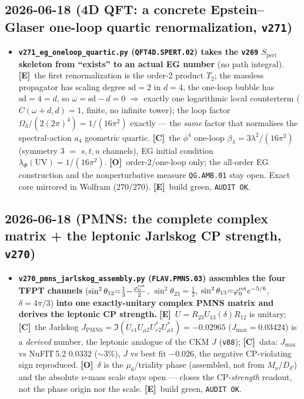 \documentclass[11pt]{article}
\providecommand{\mE}{\textbf{[E]}}\providecommand{\mC}{\textbf{[C]}}
\providecommand{\mO}{\textbf{[O]}}\providecommand{\mX}{\textbf{[X]}}
\providecommand{\vref}[1]{\texttt{#1}}
\begin{document}
\subsection*{2026-06-18 (4D QFT: a concrete Epstein--Glaser one-loop quartic renormalization, \texttt{v271})}
\begin{itemize}
\item \textbf{\texttt{v271\_eg\_oneloop\_quartic.py} (\texttt{QFT4D.SPERT.02}) takes the \vref{v269} $S_{\mathrm{pert}}$
  skeleton from ``exists'' to an actual EG number} (no path integral). \mE\ the first renormalization is the
  order-2 product $T_2$; the massless propagator has scaling degree $\mathrm{sd}{=}2$ in $d{=}4$, the one-loop
  bubble has $\mathrm{sd}{=}4{=}d$, so $\omega{=}\mathrm{sd}{-}d{=}0$ $\Rightarrow$ exactly one logarithmic local
  counterterm ($C(\omega{+}d,d){=}1$, finite, no infinite tower); the loop factor $\Omega_3/(2(2\pi)^4)=1/(16\pi^2)$
  exactly --- the \emph{same} factor that normalises the spectral-action $a_4$ geometric quartic. \mC\ the
  $\phi^4$ one-loop $\beta_\lambda=3\lambda^2/(16\pi^2)$ (symmetry $3$ $=$ $s,t,u$ channels), EG initial condition
  $\lambda_\Phi(\mathrm{UV})=1/(16\pi^2)$. \mO\ order-2/one-loop only; the all-order EG construction and the
  nonperturbative measure \texttt{QG.AMB.01} stay open. Exact core mirrored in Wolfram ($270/270$). \mE\ build
  green, \texttt{AUDIT OK}.
\end{itemize}

\subsection*{2026-06-18 (PMNS: the complete complex matrix + the leptonic Jarlskog CP strength, \texttt{v270})}
\begin{itemize}
\item \textbf{\texttt{v270\_pmns\_jarlskog\_assembly.py} (\texttt{FLAV.PMNS.03}) assembles the four TFPT
  channels} ($\sin^2\theta_{12}{=}\tfrac13{-}\tfrac{\varphi_0^{\mathrm{ret}}}2$, $\sin^2\theta_{23}{=}\tfrac12$,
  $\sin^2\theta_{13}{=}\varphi_0^{\mathrm{ret}} e^{-5/6}$, $\delta{=}4\pi/3$) \textbf{into one exactly-unitary complex PMNS
  matrix and derives the leptonic CP strength.} \mE\ $U=R_{23}U_{13}(\delta)R_{12}$ is unitary; \mC\ the
  Jarlskog $J_{\mathrm{PMNS}}=\Im(U_{e1}U_{\mu2}U_{e2}^{*}U_{\mu1}^{*})=-0.02965$ ($J_{\max}=0.03424$) is a
  \emph{derived} number, the leptonic analogue of the CKM $J$ (\vref{v88}); \mC\ data: $J_{\max}$ vs NuFIT\,5.2
  $0.0332$ ($\sim3\%$), $J$ vs best fit $-0.026$, the negative CP-violating sign reproduced. \mO\ $\delta$ is
  the $\mu_6$/triality phase (assembled, not from $M_\nu/D_F$) and the absolute $\nu$-mass scale stays open ---
  closes the CP-\emph{strength} readout, not the phase origin nor the scale. \mE\ build green, \texttt{AUDIT OK}.
\end{itemize}
\end{document}
